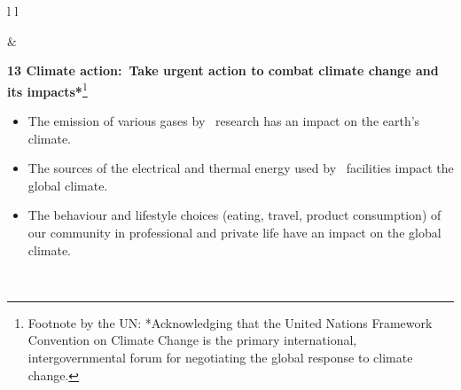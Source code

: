 \documentclass[../SustainableHEP.tex]{subfiles}
\begin{document}
\begin{longtable*}{l l}
\parbox[t]{\SDGleft\textwidth}{} & \savenotes\parbox[t]{\SDGright\textwidth}{\textbf{13 Climate action:\ Take urgent action to combat climate change and its impacts*}\footnote{Footnote by the UN: *Acknowledging that the United Nations Framework Convention on Climate Change is the primary international, intergovernmental forum for negotiating the global response to climate change.}
\begin{itemize}[leftmargin=20pt]
\item The emission of various gases by \ACR\ research has an impact on the earth’s climate.
\item The sources of the electrical and thermal energy used by \ACR\ facilities impact the global climate.
\item The behaviour and lifestyle choices (eating, travel, product consumption) of our community in professional and private life have an impact on the global climate.
\end{itemize}}\spewnotes\\


\end{longtable*}
\end{document}
